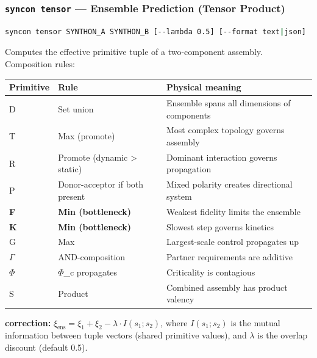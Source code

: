 \documentclass[12pt,a4paper]{article}
\begin{document}
\subsubsection{\texttt{syncon tensor} --- Ensemble Prediction (Tensor Product)}

\begin{lstlisting}[language=bash]
syncon tensor SYNTHON_A SYNTHON_B [--lambda 0.5] [--format text|json]
\end{lstlisting}

Computes the effective primitive tuple of a two-component assembly. Composition rules:

\begin{table}[htbp]
\centering
\small
{}
\begin{tabularx}{\textwidth}{>{\centering\arraybackslash}X >{\centering\arraybackslash}X >{\centering\arraybackslash}X}
\toprule
\rowcolor{gray!25}\textbf{Primitive} & \textbf{Rule} & \textbf{Physical meaning} \\
\midrule
\rowcolors{1}{white}{gray!10}
D & Set union & Ensemble spans all dimensions of components \\
T & Max (promote) & Most complex topology governs assembly \\
R & Promote (dynamic \textgreater{} static) & Dominant interaction governs propagation \\
P & Donor-acceptor if both present & Mixed polarity creates directional system \\
\textbf{F} & \textbf{Min (bottleneck)} & Weakest fidelity limits the ensemble \\
\textbf{K} & \textbf{Min (bottleneck)} & Slowest step governs kinetics \\
G & Max & Largest-scale control propagates up \\
$\Gamma$ & AND-composition & Partner requirements are additive \\
$\Phi$ & $\Phi$\_c propagates & Criticality is contagious \\
S & Product & Combined assembly has product valency \\
\bottomrule
\end{tabularx}
\end{table}

\textbf{\xi correction:} $\xi_{\text{ens}} = \xi_1 + \xi_2 - \lambda \cdot I(s_1; s_2)$, where $I(s_1; s_2)$ is the mutual information between tuple vectors (shared primitive values), and $\lambda$ is the overlap discount (default 0.5).
\end{document}
